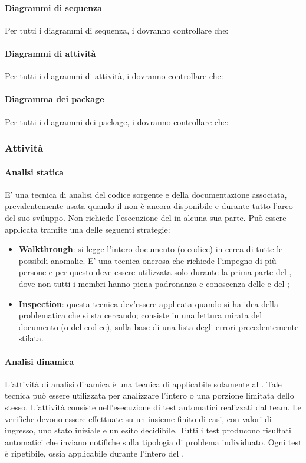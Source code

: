 \paragraph{Diagrammi di sequenza}
Per tutti i diagrammi di sequenza, i \VERP{} dovranno controllare che:
\paragraph{Diagrammi di attività}
Per tutti i diagrammi di attività, i \VERP{} dovranno controllare che:
\paragraph{Diagramma dei package}
Per tutti i diagrammi dei package, i \VERP{} dovranno controllare che:
\subsubsection{Attività}
\paragraph{Analisi statica}
E' una tecnica di analisi del codice sorgente e della documentazione associata, prevalentemente
usata quando il  non è ancora disponibile e durante tutto l'arco del suo sviluppo. Non
richiede l'esecuzione del   in alcuna sua parte. Può essere applicata tramite una
delle seguenti strategie:
\begin{itemize}
	\item \textbf{Walkthrough}: si legge l'intero documento (o codice) in cerca di tutte le possibili anomalie. E' una tecnica onerosa che richiede l'impegno di più persone e per questo deve essere utilizzata solo durante la prima parte del , dove non tutti i membri hanno piena padronanza e conoscenza delle \NPdoc e del \PQdoc;
	\item \textbf{Inspection}: questa tecnica dev'essere applicata quando si ha idea della
	problematica che si sta cercando; consiste in una lettura mirata del
	documento (o del codice), sulla base di una lista degli errori precedentemente
	stilata.
\end{itemize}
\paragraph{Analisi dinamica}
L'attività di analisi dinamica è una tecnica di  applicabile solamente al . Tale tecnica può essere utilizzata per analizzare l'intero  o una
porzione limitata dello stesso. L'attività consiste nell'esecuzione di test automatici realizzati
dal team. Le verifiche devono essere effettuate su un insieme finito di casi, con valori di
ingresso, uno stato iniziale e un esito decidibile. Tutti i test producono risultati automatici
che inviano notifiche sulla tipologia di problema individuato. Ogni test è ripetibile, ossia
applicabile durante l'intero  del .

